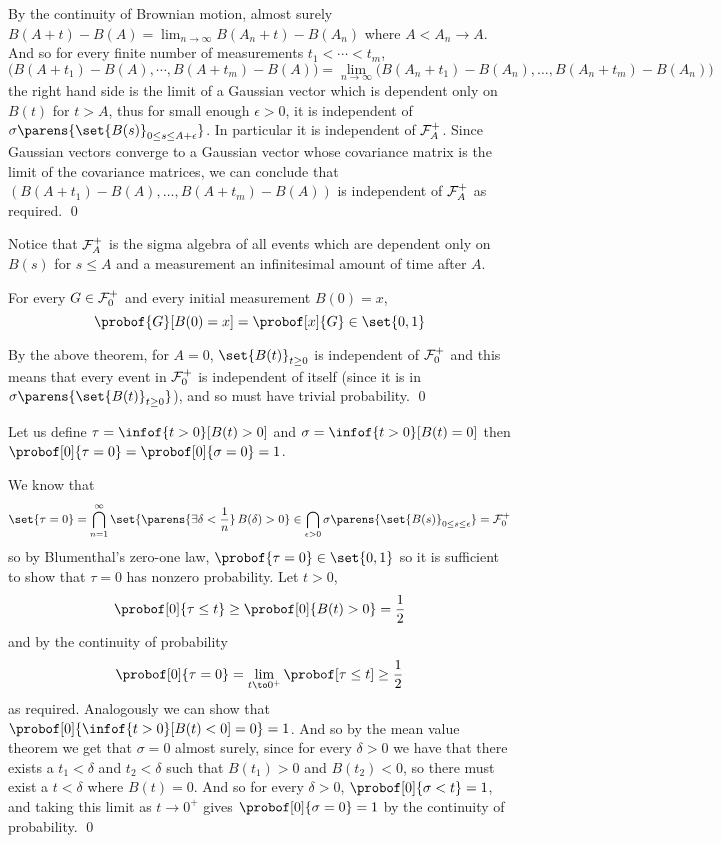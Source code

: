 \ethrm

By the continuity of Brownian motion, almost surely $B(A+t)-B(A)=\lim_{n\to\infty}B(A_n+t)-B(A_n)$ where $A<A_n\to A$.
And so for every finite number of measurements $t_1<\cdots<t_m$,
$$ \bigl(B(A+t_1) - B(A),\cdots, B(A+t_m) - B(A)\bigr) = \lim_{n\to\infty}\bigl(B(A_n+t_1)-B(A_n),\dots,B(A_n+t_m) - B(A_n)\bigr) $$
the right hand side is the limit of a Gaussian vector which is dependent only on $B(t)$ for $t>A$, thus for small enough $\epsilon>0$, it is independent of
$\sigma\parens{\set{B(s)}_{0\leq s\leq A+\epsilon}}$.
In particular it is independent of ${\cal F}_A^+$.
Since Gaussian vectors converge to a Gaussian vector whose covariance matrix is the limit of the covariance matrices, we can conclude that $(B(A+t_1)-B(A),\dots,B(A+t_m)-B(A))$ is independent of
${\cal F}_A^+$ as required.
\qed

Notice that ${\cal F}_A^+$ is the sigma algebra of all events which are dependent only on $B(s)$ for $s\leq A$ and a measurement an infinitesimal amount of time after $A$.

\bthrm[title=Blumenthal's Zero-One Law, name=blumenzeroone]

    For every $G\in{\cal F}_0^+$ and every initial measurement $B(0)=x$,
    $$ \probof{G}[B(0)=x] = \probof[x]{G} \in \set{0,1} $$

\ethrm

By the above theorem, for $A=0$, $\set{B(t)}_{t\geq0}$ is independent of ${\cal F}_0^+$ and this means that every event in ${\cal F}_0^+$ is independent of itself (since it is in
$\sigma\parens{\set{B(t)}_{t\geq0}}$), and so must have trivial probability.
\qed

\bthrm[name=Volatility of Brownian Motion]

    Let us define $\tau=\infof{t>0}[B(t)>0]$ and $\sigma=\infof{t>0}[B(t)=0]$ then $\probof[0]{\tau=0}=\probof[0]{\sigma=0}=1$.

\ethrm

We know that
$$ \set{\tau=0} = \bigcap_{n=1}^\infty\set{\parens{\exists\delta<\frac1n}\,B(\delta)>0} \in \bigcap_{\epsilon>0}\sigma\parens{\set{B(s)}_{0\leq s\leq\epsilon}} = {\cal F}_0^+ $$
so by Blumenthal's zero-one law, $\probof{\tau=0}\in\set{0,1}$ so it is sufficient to show that $\tau=0$ has nonzero probability.
Let $t>0$,
$$ \probof[0]{\tau\leq t} \geq \probof[0]{B(t)>0} = \frac12 $$
and by the continuity of probability
$$ \probof[0]{\tau=0} = \lim_{t\to0^+}\probof[\tau\leq t] \geq \frac12 $$
as required.
Analogously we can show that $\probof[0]{\infof{t>0}[B(t)<0]=0}=1$.
And so by the mean value theorem we get that $\sigma=0$ almost surely, since for every $\delta>0$ we have that there exists a $t_1<\delta$ and $t_2<\delta$ such that $B(t_1)>0$ and $B(t_2)<0$, so there
must exist a $t<\delta$ where $B(t)=0$.
And so for every $\delta>0$, $\probof[0]{\sigma<t}=1$, and taking this limit as $t\to0^+$ gives $\probof[0]{\sigma=0}=1$ by the continuity of probability.
\qed

